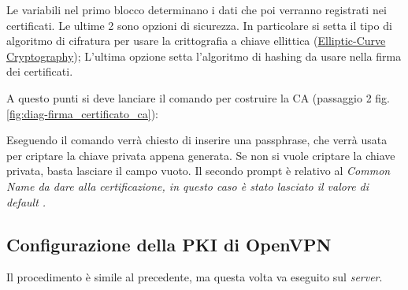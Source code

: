 \workinprogress

Le variabili nel primo blocco determinano i dati che poi verranno registrati nei certificati. Le ultime 2 sono opzioni di sicurezza. In particolare si setta il tipo di algoritmo di cifratura per usare la crittografia a chiave ellittica (\href{https://en.wikipedia.org/wiki/Elliptic-curve_cryptography}{Elliptic-Curve Cryptography}); L'ultima opzione setta l'algoritmo di hashing da usare nella firma dei certificati.

A questo punti si deve lanciare il comando  per costruire la CA (passaggio 2 fig.\ref{fig:diag-firma_certificato_ca}):


Eseguendo il comando verrà chiesto di inserire una passphrase, che verrà usata per criptare la chiave privata appena generata. Se non si vuole criptare la chiave privata, basta lasciare il campo vuoto. Il secondo prompt è relativo al \it{Common Name} da dare alla certificazione, in questo caso è stato lasciato il valore di default .

\subsection{Configurazione della PKI di OpenVPN} %
\label{sec:pki_openvpn}

Il procedimento è simile al precedente, ma questa volta va eseguito sul \textit{server}.

